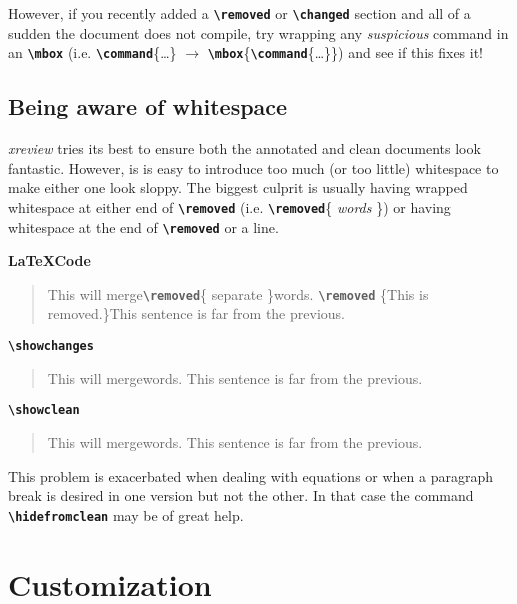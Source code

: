 \documentclass[a4paper]{ltxdoc}
\newcommand{\writecommand}[1]{\texttt{\textbf{{\textbackslash#1}}}}
\newcommand{\writearg}[1]{\{#1\}}
\begin{document}
However, if you recently added a \writecommand{removed} or \writecommand{changed} section and all of a sudden the document does not compile, try wrapping any \textit{suspicious} command in an \writecommand{mbox} (i.e. \writecommand{command}\writearg{\dots} $\rightarrow$ \writecommand{mbox}\{\writecommand{command}\writearg{\dots}\}) and see if this fixes it!

\subsection{Being aware of whitespace}

\textit{xreview} tries its best to ensure both the annotated and clean documents look fantastic. However, is is easy to introduce too much (or too little) whitespace to make either one look sloppy. The biggest culprit is usually having wrapped whitespace at either end of \writecommand{removed} (i.e. \writecommand{removed}\writearg{ \textit{words} }) or having whitespace at the end of \writecommand{removed} or a line.

\textbf{\LaTeX Code}

\begin{quote}
    This will merge\writecommand{removed}\writearg{ separate }words.
    \writecommand{removed} \writearg{This is removed.}\textvisiblespace This sentence is far from the previous. 
\end{quote}

\writecommand{showchanges}
\showchanges

\begin{quote}
    This will mergewords.
     This sentence is far from the previous. 
\end{quote}

\writecommand{showclean}
\showclean

\begin{quote}
    This will mergewords.
     This sentence is far from the previous. 
\end{quote}

\showchanges

This problem is exacerbated when dealing with equations or when a paragraph break is desired in one version but not the other. In that case the command \writecommand{hidefromclean} may be of great help.

\section{Customization}
\label{sec:custom}
\end{document}

